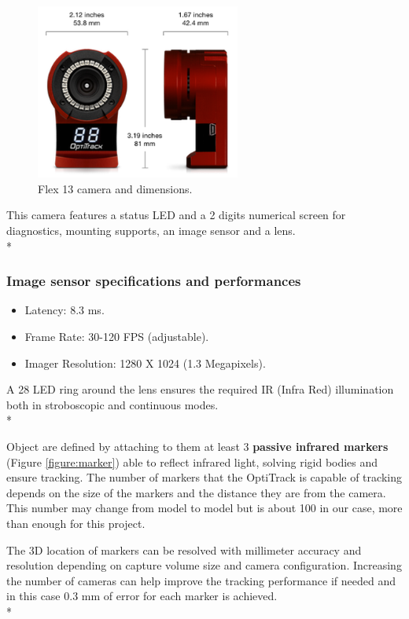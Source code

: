 \begin{figure}[H]
 \centering
 \includegraphics[width=0.6\textwidth]{flex13.PNG}
 \caption[Flex 13 Cameras]{Flex 13 camera and dimensions.}
 \label{figure:flex13}
\end{figure}
\noindent
This camera features a status LED and a 2 digits numerical screen for diagnostics, mounting supports, an image sensor and a lens.\\*


\subsubsection{Image sensor specifications and performances}
\begin{itemize}
\item Latency: 8.3 ms.
\item Frame Rate: 30-120 FPS (adjustable).
\item Imager Resolution: 1280 X 1024 (1.3 Megapixels).
\end{itemize}
\noindent
A 28 LED ring around the lens ensures the required IR (Infra Red) illumination both in stroboscopic and continuous modes. \\*

Object are defined by attaching to them at least 3 \textbf {passive infrared markers} (Figure \ref{figure:marker}) able to reflect infrared light, solving rigid bodies and ensure tracking. The number of markers that the OptiTrack is capable of tracking depends on the size of the markers and the distance they are from the camera. This number may change from model to model but is about 100 in our case, more than enough for this project.\par The 3D location of markers can be resolved with millimeter accuracy and resolution depending on capture volume size and camera configuration. Increasing the number of cameras can help improve the tracking performance if needed and in this case 0.3 mm of error for each marker is achieved. \\* 

